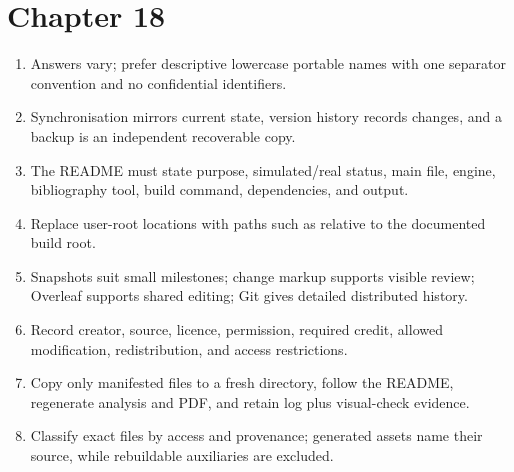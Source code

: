 \section*{Chapter 18}
\begin{enumerate}[label=18.\arabic*,leftmargin=2.4em,itemsep=0.45em]
  \item Answers vary; prefer descriptive lowercase portable names with one
        separator convention and no confidential identifiers.
  \item Synchronisation mirrors current state, version history records changes,
        and a backup is an independent recoverable copy.
  \item The README must state purpose, simulated/real status, main file, engine,
        bibliography tool, build command, dependencies, and output.
  \item Replace user-root locations with paths such as
         relative to the documented build root.
  \item Snapshots suit small milestones; change markup supports visible review;
        Overleaf supports shared editing; Git gives detailed distributed history.
  \item Record creator, source, licence, permission, required credit, allowed
        modification, redistribution, and access restrictions.
  \item Copy only manifested files to a fresh directory, follow the README,
        regenerate analysis and PDF, and retain log plus visual-check evidence.
  \item Classify exact files by access and provenance; generated assets name
        their source, while rebuildable auxiliaries are excluded.
\end{enumerate}

